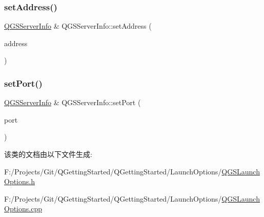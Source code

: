 \mbox{\label{class_q_g_s_server_info_a8b12570be75e62455bcc95ce202a3d31}} 
\subsubsection{\texorpdfstring{set\+Address()}{setAddress()}}
{\footnotesize\ttfamily \mbox{\hyperlink{class_q_g_s_server_info}{Q\+G\+S\+Server\+Info}} \& Q\+G\+S\+Server\+Info\+::set\+Address (\begin{DoxyParamCaption}\item[{const Q\+String \&}]{address }\end{DoxyParamCaption})}

\mbox{\label{class_q_g_s_server_info_a374a34addce32de879ce4735699c196f}} 
\subsubsection{\texorpdfstring{set\+Port()}{setPort()}}
{\footnotesize\ttfamily \mbox{\hyperlink{class_q_g_s_server_info}{Q\+G\+S\+Server\+Info}} \& Q\+G\+S\+Server\+Info\+::set\+Port (\begin{DoxyParamCaption}\item[{const Q\+String \&}]{port }\end{DoxyParamCaption})}



该类的文档由以下文件生成\+:\begin{DoxyCompactItemize}
\item 
F\+:/\+Projects/\+Git/\+Q\+Getting\+Started/\+Q\+Getting\+Started/\+Launch\+Options/\mbox{\hyperlink{_q_g_s_launch_options_8h}{Q\+G\+S\+Launch\+Options.\+h}}\item 
F\+:/\+Projects/\+Git/\+Q\+Getting\+Started/\+Q\+Getting\+Started/\+Launch\+Options/\mbox{\hyperlink{_q_g_s_launch_options_8cpp}{Q\+G\+S\+Launch\+Options.\+cpp}}\end{DoxyCompactItemize}
